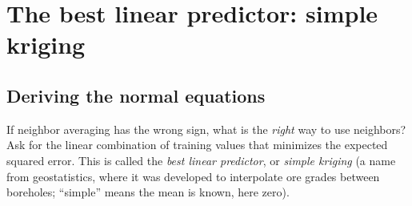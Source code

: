 \section{The best linear predictor: simple kriging}\label{sec:generalization-kriging}

\subsection{Deriving the normal equations}

If neighbor averaging has the wrong sign, what is the \emph{right} way to use neighbors? Ask for the linear combination of training values that minimizes the expected squared error. This is called the \emph{best linear predictor}, or \emph{simple kriging} (a name from geostatistics, where it was developed to interpolate ore grades between boreholes; ``simple'' means the mean is known, here zero).

